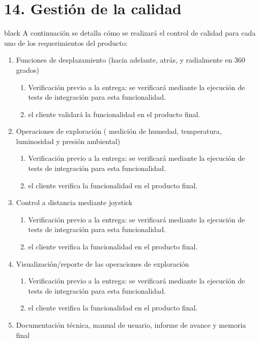\documentclass[
11pt, %
]{charter}
\begin{document}
\section{14. Gestión de la calidad}
\label{sec:calidad}
\begin{consigna}{black}
A continuación se detalla cómo se realizará el control de calidad para cada uno de los requerimientos del producto:
\begin{enumerate}	
			
		\item Funciones de desplazamiento (hacia adelante, atrás, y radialmente en 360 grados)
		\begin{enumerate}				
			\item Verificación previo a la entrega: se verificará mediante la ejecución de tests de integración para esta funcionalidad.			
			\item el cliente validará la funcionalidad en el producto final.			
		\end{enumerate}		
		\item Operaciones de exploración ( medición de humedad, temperatura, luminosidad y presión ambiental)
		\begin{enumerate}				
			\item Verificación previo a la entrega: se verificará mediante la ejecución de tests de integración para esta funcionalidad.			
			\item el cliente verifica la funcionalidad en el producto final.			
		\end{enumerate}		
		\item Control a distancia mediante joystick
		\begin{enumerate}				
			\item Verificación previo a la entrega: se verificará mediante la ejecución de tests de integración para esta funcionalidad.			
			\item el cliente verifica la funcionalidad en el producto final.			
		\end{enumerate}			
		\item Visualización/reporte de las operaciones de exploración 
		\begin{enumerate}				
			\item Verificación previo a la entrega: se verificará mediante la ejecución de tests de integración para esta funcionalidad.			
			\item el cliente verifica la funcionalidad en el producto final.			
		\end{enumerate}			
		\item Documentación técnica, manual de usuario, informe de avance y memoria final

\end{enumerate}
\end{consigna}
\end{document}
